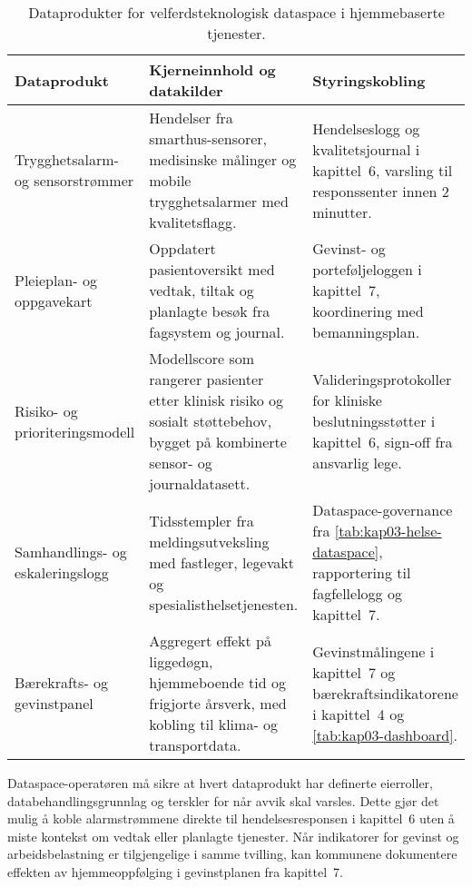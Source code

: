 \begin{table}[ht]
    \centering
    \caption{Dataprodukter for velferdsteknologisk dataspace i hjemmebaserte tjenester.}
    \label{tab:velferd-dataprodukter}
    \begin{tabular}{p{}p{}p{}}
        \toprule
        \textbf{Dataprodukt} & \textbf{Kjerneinnhold og datakilder} & \textbf{Styringskobling} \\
        \midrule
        Trygghetsalarm- og sensorstrømmer & Hendelser fra smarthus-sensorer, medisinske målinger og mobile trygghetsalarmer med kvalitetsflagg. & Hendelseslogg og kvalitetsjournal i kapittel~6, varsling til responssenter innen 2 minutter. \\
        Pleieplan- og oppgavekart & Oppdatert pasientoversikt med vedtak, tiltak og planlagte besøk fra fagsystem og journal. & Gevinst- og porteføljeloggen i kapittel~7, koordinering med bemanningsplan. \\
        Risiko- og prioriteringsmodell & Modellscore som rangerer pasienter etter klinisk risiko og sosialt støttebehov, bygget på kombinerte sensor- og journaldatasett. & Valideringsprotokoller for kliniske beslutningsstøtter i kapittel~6, sign-off fra ansvarlig lege. \\
        Samhandlings- og eskaleringslogg & Tidsstempler fra meldingsutveksling med fastleger, legevakt og spesialisthelsetjenesten. & Dataspace-governance fra \autoref{tab:kap03-helse-dataspace}, rapportering til fagfellelogg og kapittel~7. \\
        Bærekrafts- og gevinstpanel & Aggregert effekt på liggedøgn, hjemmeboende tid og frigjorte årsverk, med kobling til klima- og transportdata. & Gevinstmålingene i kapittel~7 og bærekraftsindikatorene i kapittel~4 og \autoref{tab:kap03-dashboard}. \\
        \bottomrule
    \end{tabular}
\end{table}

Dataspace-operatøren må sikre at hvert dataprodukt har definerte eierroller, databehandlingsgrunnlag og terskler for når avvik skal varsles. Dette gjør det mulig å koble alarmstrømmene direkte til hendelsesresponsen i kapittel~6 uten å miste kontekst om vedtak eller planlagte tjenester. Når indikatorer for gevinst og arbeidsbelastning er tilgjengelige i samme tvilling, kan kommunene dokumentere effekten av hjemmeoppfølging i gevinstplanen fra kapittel~7.

